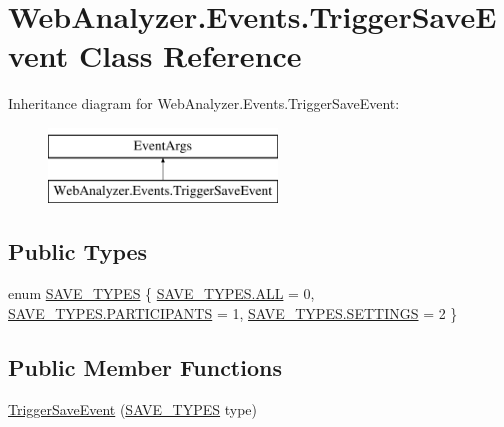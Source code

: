 \hypertarget{class_web_analyzer_1_1_events_1_1_trigger_save_event}{}\section{Web\+Analyzer.\+Events.\+Trigger\+Save\+Event Class Reference}
\label{class_web_analyzer_1_1_events_1_1_trigger_save_event}
Inheritance diagram for Web\+Analyzer.\+Events.\+Trigger\+Save\+Event\+:\begin{figure}[H]
\begin{center}
\leavevmode
\includegraphics[height=2.000000cm]{class_web_analyzer_1_1_events_1_1_trigger_save_event}
\end{center}
\end{figure}
\subsection*{Public Types}
\begin{DoxyCompactItemize}
\item 
enum \hyperlink{class_web_analyzer_1_1_events_1_1_trigger_save_event_a4eec94af974a1711b6e32010e3e54c0d}{S\+A\+V\+E\+\_\+\+T\+Y\+P\+E\+S} \{ \hyperlink{class_web_analyzer_1_1_events_1_1_trigger_save_event_a4eec94af974a1711b6e32010e3e54c0da5fb1f955b45e38e31789286a1790398d}{S\+A\+V\+E\+\_\+\+T\+Y\+P\+E\+S.\+A\+L\+L} = 0, 
\hyperlink{class_web_analyzer_1_1_events_1_1_trigger_save_event_a4eec94af974a1711b6e32010e3e54c0da41d4e02780b46eeb797f488ec6ded226}{S\+A\+V\+E\+\_\+\+T\+Y\+P\+E\+S.\+P\+A\+R\+T\+I\+C\+I\+P\+A\+N\+T\+S} = 1, 
\hyperlink{class_web_analyzer_1_1_events_1_1_trigger_save_event_a4eec94af974a1711b6e32010e3e54c0daed6f7aca7887a927b9ed3d62aa347a86}{S\+A\+V\+E\+\_\+\+T\+Y\+P\+E\+S.\+S\+E\+T\+T\+I\+N\+G\+S} = 2
 \}
\end{DoxyCompactItemize}
\subsection*{Public Member Functions}
\begin{DoxyCompactItemize}
\item 
\hyperlink{class_web_analyzer_1_1_events_1_1_trigger_save_event_aadd2b41f0dcf12aaa2e6258334e7d69a}{Trigger\+Save\+Event} (\hyperlink{class_web_analyzer_1_1_events_1_1_trigger_save_event_a4eec94af974a1711b6e32010e3e54c0d}{S\+A\+V\+E\+\_\+\+T\+Y\+P\+E\+S} type)
\end{DoxyCompactItemize}
